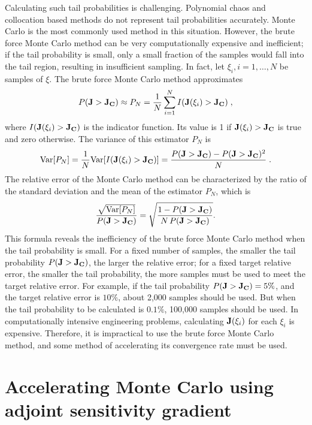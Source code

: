 Calculating such tail probabilities is challenging.
Polynomial chaos and collocation based methods do not represent tail
probabilities accurately.
Monte Carlo is the most commonly used method in this situation.
However, the brute force
Monte Carlo method can be very computationally expensive and inefficient;
if the tail probability is small, only a small fraction of
the samples would fall into the tail region, resulting in insufficient
sampling.  In fact, let $\xi_i, i=1,\ldots,N$ be samples of $\xi$.
The brute force Monte Carlo method approximates
\[ P({\bf J} > {\bf J_C}) \approx P_N =
   \frac{1}{N} \sum_{i=1}^N I({\bf J}(\xi_i) > {\bf J_C}) \;, \]
where $I({\bf J}(\xi_i) > {\bf J_C})$ is the indicator function.  Its value
is 1 if ${\bf J}(\xi_i) > {\bf J_C}$ is true and zero otherwise.
The variance of this estimator $P_N$ is
\begin{equation} \label{var_naive}
  \mathrm{Var}[P_N] = \frac{1}{N} \mathrm{Var}[I({\bf J}(\xi_i) > {\bf J_C})]
   = \frac{P({\bf J} > {\bf J_C}) - P({\bf J} > {\bf J_C})^2}{N} \;.
\end{equation}
The relative error of the Monte Carlo method can be characterized by the
ratio of the standard deviation and the mean of the estimator $P_N$, which is
\[ \frac{\sqrt{\mathrm{Var}[P_N]}}{P({\bf J} > {\bf J_C})}
 = \sqrt{\frac{1 - P({\bf J} > {\bf J_C})}{N\,P({\bf J} > {\bf J_C})}} .\]
This formula reveals the inefficiency of the brute force Monte Carlo method when
the tail probability is small.  For a fixed number of samples,
the smaller the tail probability $P({\bf J} > {\bf J_C})$, the larger
the relative error; for a fixed target relative error, the smaller the
tail probability, the more samples must be used to meet the target relative
error.  For example, if the tail probability $P({\bf J} > {\bf J_C}) = 5\%$,
and the target relative error is $10\%$, about 2,000 samples should be used.
But when the tail probability to be calculated is $0.1\%$, 100,000 samples
should be used.  In computationally intensive engineering problems, calculating
${\bf J}(\xi_i)$ for each $\xi_i$ is expensive.  Therefore, it is impractical
to use the brute force Monte Carlo method, and some method of accelerating
its convergence rate must be used.



\section{Accelerating Monte Carlo using adjoint sensitivity gradient}

